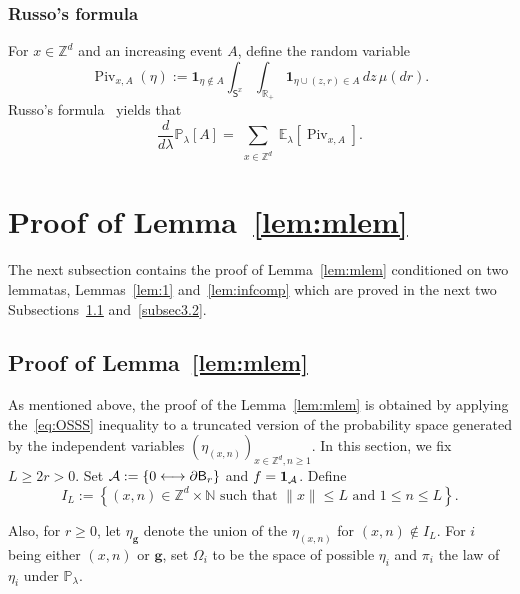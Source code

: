 \documentclass[AHL,Unicode,longabstracts]{cedram}
\newcommand{\gbf}{\mathbf{g}}
\DeclareMathOperator{\Piv}{Piv}
\begin{document}
\subsubsection{Russo's formula}
For $x\in {\mathbb Z}^d$ and an increasing event $A$, define the random variable
\begin{equation}\label{eq:pivdef}
\Piv_{x,A} (\eta) := \mathbf 1_{\eta \notin A}\int_{\mathsf S^x} \int_{{\mathbb R}_+} \mathbf 1_{\eta \cup (z, r) \in A} \,dz \, \mu(d r).
\end{equation}
Russo's formula~\cite[Equation 19.2]{LP17} yields that
\begin{equation}\label{eq:russo}
\tag{Russo}
\frac{d}{d\lambda}{\mathbb P}_\lambda [A] = \sum_{\substack{x \in {\mathbb Z}^d}} {\mathbb E}_\lambda [\Piv_{x,A}].
\end{equation}



\section{Proof of Lemma~\ref{lem:mlem}}\label{sec:3}
The next subsection contains the proof of Lemma~\ref{lem:mlem} conditioned on two lemmatas, Lemmas~\ref{lem:1} and~\ref{lem:infcomp} which are proved in the next two Subsections~\ref{subsec3.1} and~\ref{subsec3.2}.
\subsection{Proof of Lemma~\ref{lem:mlem}}\label{subsec3.1}
As mentioned above, the proof of the Lemma~\ref{lem:mlem} is obtained by applying the~\eqref{eq:OSSS} inequality to a truncated version of the probability space generated by the independent variables $(\eta_{(x,n)})_{x\in{\mathbb Z}^d,n\ge1}$. In this section, we fix $L\ge 2r>0$. Set ${\mathcal A}:=\linebreak\{0\stackrel{}\longleftrightarrow \partial\mathsf B_r\}$ and $f={\bf 1}_{\mathcal A}$. Define
\[
I_L:=\left\{(x,n)\in{\mathbb Z}^d\times{\mathbb N}\text{ such that } \|x\|\le L\text{ and }1\le n\le L\right\}.
\]

Also, for $r\ge0$, let $\eta_{\gbf}$ denote the union of the $\eta_{(x,n)}$ for $(x,n)\notin I_L$. For $i$ being either $(x,n)$ or ${\gbf}$, set $\Omega_i$ to be the space of possible $\eta_i$ and $\pi_i$ the law of $\eta_i$ under ${\mathbb P}_\lambda$.
\end{document}
